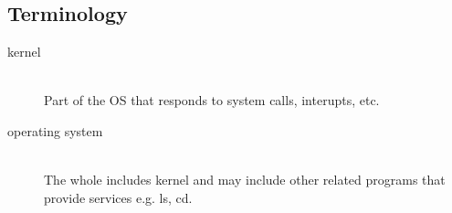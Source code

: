\documentclass[12pt]{article}
\begin{document}
\subsection*{Terminology}

\begin{description}
    \item[kernel] \hfill\\
        Part of the OS that responds to system calls, interupts, etc.
    \item[operating system] \hfill\\
        The whole includes kernel and may include other related programs that
        provide services e.g. ls, cd.
\end{description}
\end{document}
